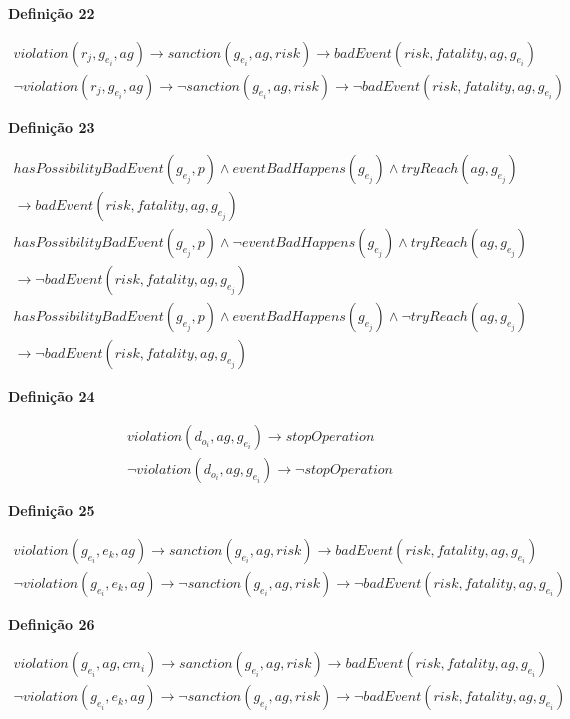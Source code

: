\documentclass[12pt]{article}
\begin{document}
\textbf{Definição 22}

\begin{eqnarray}
violation(r_j,g_{e_i},ag) \to sanction(g_{e_i},ag,risk) \to badEvent(risk,fatality,ag,g_{e_i}) \\
\neg violation(r_j,g_{e_i},ag) \to \neg sanction(g_{e_i},ag,risk) \to \neg  badEvent(risk,fatality,ag,g_{e_i})
\end{eqnarray}


\textbf{Definição 23}

\begin{eqnarray}
hasPossibilityBadEvent(g_{e_j},p) \wedge eventBadHappens(g_{e_j}) \wedge tryReach(ag,g_{e_j}) \\ \to badEvent(risk,fatality,ag,g_{e_j}) \\ 
hasPossibilityBadEvent(g_{e_j},p) \wedge \neg eventBadHappens(g_{e_j}) \wedge tryReach(ag,g_{e_j}) \\ \to \neg badEvent(risk,fatality,ag,g_{e_j}) \\
hasPossibilityBadEvent(g_{e_j},p) \wedge  eventBadHappens(g_{e_j}) \wedge \neg tryReach(ag,g_{e_j}) \\ \to \neg badEvent(risk,fatality,ag,g_{e_j}) 
\end{eqnarray}

\textbf{Definição 24}

\begin{eqnarray}
violation(d_{o_i},ag,g_{e_i}) \to stopOperation \\
\neg violation(d_{o_i},ag,g_{e_i}) \to \neg stopOperation 
\end{eqnarray}

\textbf{Definição 25}

\begin{eqnarray}
	violation(g_{e_i},e_k,ag) \to sanction(g_{e_i},ag,risk) \to badEvent(risk,fatality,ag,g_{e_i}) \\
	\neg violation(g_{e_i},e_k,ag) \to \neg sanction(g_{e_i},ag,risk) \to \neg badEvent(risk,fatality,ag,g_{e_i})
\end{eqnarray}

\textbf{Definição 26}

\begin{eqnarray}
	violation(g_{e_i},ag,cm_i)  \to sanction(g_{e_i},ag,risk) \to badEvent(risk,fatality,ag,g_{e_i}) \\
	\neg violation(g_{e_i},e_k,ag) \to \neg sanction(g_{e_i},ag,risk) \to \neg badEvent(risk,fatality,ag,g_{e_i})
\end{eqnarray}
\end{document}
